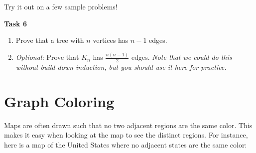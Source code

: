\documentclass[12pt,letterpaper]{article}
\newif\ifsol
\newcommand{\solu}[2]{ \begin{mdframed} \ifsol #2 \else \vspace{#1} \fi \end{mdframed} }
\begin{document}
Try it out on a few sample problems!

\newpage
\textbf{Task 6}
\begin{enumerate}
    \item Prove that a tree with $n$ vertices has $n-1$ edges.
    \solu{4cm}{Let $P(n)$ be the predicate that a tree with $n$ vertices has $n-1$ edges.
    
    Base case: A tree with 1 vertex has 0 edges

    Inductive Hypothesis: Assume all trees with $k$ vertices have $k-1$ edges.

    Inductive step: Consider a tree with $k+1$ vertices. There must be some leaf, which has one edge. Remove the leaf and its edge. The resultant graph will still be acyclic, since removing an edge cannot create a cycle, and is connected because the edge we removed only connected the removed vertex to the rest of the graph. So, we now have a tree with $k$ vertices, which by the IH has $k-1$ edges. Put the removed vertex and edge back in, and we now have $k$ edges. As our $k+1$ tree was arbitrary, all trees with $k+1$ vertices have $k$ edges.}

    \item \textit{Optional:} Prove that $K_n$ has $\frac{n(n-1)}{2}$ edges. \textit{Note that we could do this without build-down induction, but you should use it here for practice.}
    \solu{4cm}{Let $P(n)$ be the predicate that $K_n$ has $\frac{n(n-1)}{2}$ edges.
    
    Base case: $K_1$ has 0 edges, which is $\frac{1\times 0}{2}$

    IH: Assume $K_k$ has $\frac{k(k-1)}{2}$ edges

    IS: Consider $K_{k+1}$. We can get $K_k$ by removing a vertex and all its incident edges, of which there are $k$. By IH, $K_k$ has $\frac{k(k-1)}{2}$ edges. If we add back in the vertex and edges, we get $\frac{k(k-1)}{2}+k=\frac{k(k-1)+2k}{2}=\frac{k(k-1+2)}{2}=\frac{k(k+1)}{2}$ edges as needed.}
\end{enumerate}

\newpage

\section*{Graph Coloring}

Maps are often drawn such that no two adjacent regions are the same color. This makes it easy when looking at the map to see the distinct regions. For instance, here is a map of the United States where no adjacent states are the same color:
\end{document}
